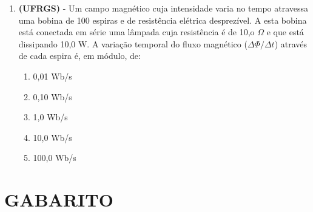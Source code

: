 \documentclass[12pt,letterpaper,fleqn]{article}
\begin{document}
\begin{enumerate}
\item \textbf{(UFRGS)} - Um campo magnético cuja intensidade varia no tempo atravessa uma bobina de 100 espiras e de resistência elétrica desprezível. A esta bobina está conectada em série uma lâmpada cuja resistência é de 10,o $\Omega$ e que está dissipando 10,0 W. A variação temporal do fluxo magnético ($\Delta \Phi/ \Delta t$) através de cada espira é, em módulo, de:

\begin{enumerate}
    \item 0,01 Wb/s
    \item 0,10 Wb/s
    \item 1,0 Wb/s
    \item 10,0 Wb/s
    \item 100,0 Wb/s
\end{enumerate}
    \end{enumerate}
    
    \pagebreak
    \section*{GABARITO}
    
\end{document}
